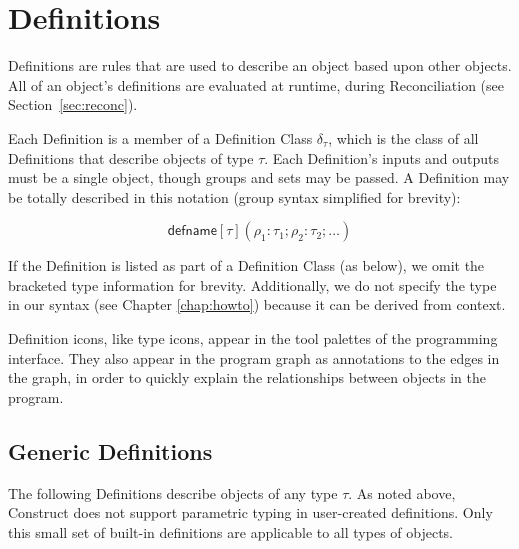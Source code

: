 \documentclass[twoside,openright,11pt]{report}
\begin{document}
\section{Definitions}
\label{sec:def}

Definitions are rules that are used to describe an object based upon other objects. 
All of an object's definitions are evaluated at runtime, during Reconciliation (see Section~\ref{sec:reconc}). 

Each Definition is a member of a Definition Class $\delta_\tau$, which is the class of all Definitions that describe objects of type $\tau$. 
Each Definition's inputs and outputs must be a single object, though groups and sets may be passed.
A Definition may be totally described in this notation (group syntax simplified for brevity): 

$$\mathsf{defname}[\tau](\rho_1 : \tau_1; \rho_2 : \tau_2; \dots)$$

If the Definition is listed as part of a Definition Class (as below), we omit the bracketed type information for brevity. 
Additionally, we do not specify the type in our syntax (see Chapter \ref{chap:howto}) because it can be derived from context.

Definition icons, like type icons, appear in the tool palettes of the programming interface. 
They also appear in the program graph as annotations to the edges in the graph, in order to quickly explain the relationships between objects in the program.

\subsection{Generic Definitions}
\label{subsec:def-gen}

The following Definitions describe objects of any type $\tau$. 
As noted above, Construct does not support parametric typing in user-created definitions. 
Only this small set of built-in definitions are applicable to all types of objects. \\
\end{document}
